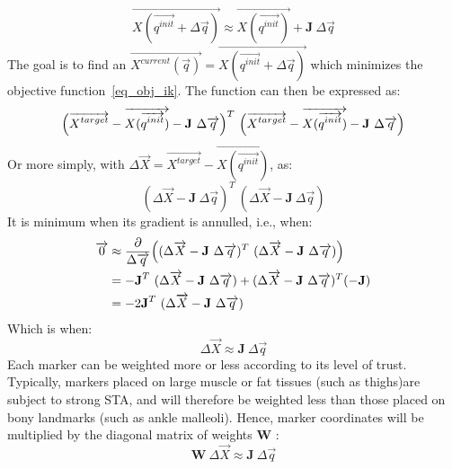 \begin{equation}
      \overrightarrow{X(\overrightarrow{q^{init}}+\Delta\overrightarrow{q})} 
      \approx \overrightarrow{X(\overrightarrow{q^{init}})} + \textbf{J} \ \Delta\overrightarrow{q}
\end{equation} 
The goal is to find an $\overrightarrow{X^{current}(\overrightarrow{q})} = \overrightarrow{X(\overrightarrow{q^{init}}+\Delta\overrightarrow{q})}$ which minimizes the objective function~\ref{eq_obj_ik}. The function can then be expressed as:
\begin{equation}
  \Bigl(\overrightarrow{X^{target}} - \overrightarrow{X(\overrightarrow{q^{init}})} - \textbf{J} \ \Delta\overrightarrow{q} \Bigr)^T \ 
  \Bigl(\overrightarrow{X^{target}} - \overrightarrow{X(\overrightarrow{q^{init}})} - \textbf{J} \ \Delta\overrightarrow{q} \Bigr)
\end{equation}
Or more simply, with $\Delta\overrightarrow{X} = \overrightarrow{X^{target}} - \overrightarrow{X(\overrightarrow{q^{init}})}$, as:
\begin{equation}
  (\Delta\overrightarrow{X} - \textbf{J} \ \Delta\overrightarrow{q} )^T \ 
  (\Delta\overrightarrow{X} - \textbf{J} \ \Delta\overrightarrow{q} )
\end{equation}
It is minimum when its gradient is annulled, i.e., when:
\begin{equation}
  \begin{aligned}
   \overrightarrow{0} &\approx 
   \frac{\partial}{\Delta \overrightarrow{q}}
   \Bigl( ( \Delta\overrightarrow{X} - \textbf{J} \ \Delta\overrightarrow{q})^T \ 
  (\Delta\overrightarrow{X} - \textbf{J} \ \Delta\overrightarrow{q} ) \Bigr)  \\
  & = - \textbf{J}^T \ 
  (\Delta\overrightarrow{X} - \textbf{J} \ \Delta\overrightarrow{q} ) 
  + (\Delta\overrightarrow{X} - \textbf{J} \ \Delta\overrightarrow{q} )^T 
  (-\textbf{J})\\
  & = -2 \textbf{J}^T \ 
  (\Delta\overrightarrow{X} - \textbf{J} \ \Delta\overrightarrow{q} )
  \end{aligned}
\end{equation}
Which is when:
\begin{equation}
  \Delta\overrightarrow{X} \approx \textbf{J} \ \Delta\overrightarrow{q}
\end{equation}
Each marker can be weighted more or less according to its level of trust. Typically, markers placed on large muscle or fat tissues (such as thighs)are subject to strong STA, and will therefore be weighted less than those placed on bony landmarks (such as ankle malleoli). Hence, marker coordinates will be multiplied by the diagonal matrix of weights \textbf{W} \cite{Meredith2005}:
\begin{equation}
  \boxed{
  \textbf{W} \ \Delta\overrightarrow{X} \approx \textbf{J} \ \Delta\overrightarrow{q}
  }
\end{equation}

